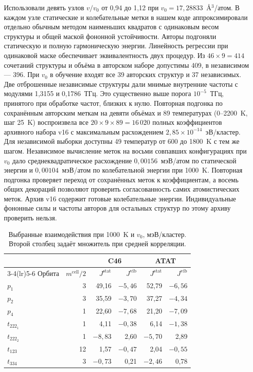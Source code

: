 \documentclass[11pt,a4paper]{article}
\begin{document}
Использовали девять узлов \(v/v_0\) от 0,94 до 1,12 при
\(v_0=17{,}28833\)~\AA\({}^3\)/атом. В каждом узле статические и
колебательные метки в нашем коде аппроксимировали отдельно обычным
методом наименьших квадратов с одинаковым весом структуры и общей
маской фононной устойчивости. Авторы подгоняли статическую и полную
гармоническую энергии. Линейность регрессии при одинаковой маске
обеспечивает эквивалентность двух процедур. Из \(46\times9=414\)
сочетаний структуры и объёма в
авторском наборе допустимы 409, в независимом --- 396. При \(v_0\)
в обучение входят все 39 авторских структур и 37 независимых. Две
отброшенные независимые структуры дали мнимые внутренние частоты с
модулями 1,3155 и 0,1786~ТГц. Это существенно выше порога
\(10^{-5}\)~ТГц, принятого при обработке частот, близких к нулю.
Повторная подгонка по сохранённым авторским меткам на девяти объёмах и
89 температурах (0--2200~K, шаг 25~K) воспроизвела все
\(20\times9\times89=16\,020\) полных коэффициентов архивного набора
v16 с максимальным расхождением \(2{,}85\times10^{-14}\)~эВ/кластер.
Для независимой выборки доступны 49 температур от 600 до 1800~K с тем же
шагом. Независимое вычисление меток на восьми совпавших конфигурациях
при \(v_0\) дало среднеквадратическое расхождение \(0{,}00156\)~мэВ/атом
по статической энергии и \(0{,}00104\)~мэВ/атом по колебательной
энергии при 1000~K. Повторная подгонка проверяет переход от сохранённых
меток к коэффициентам, а восемь общих декораций позволяют проверить
согласованность самих атомистических меток. Архив v16 содержит готовые
колебательные энергии. Индивидуальные фононные силы и частоты авторов
для остальных структур по этому архиву проверить нельзя.

\begin{table}[htbp]
\centering\small
\caption{Выбранные взаимодействия при 1000~K и \(v_0\), мэВ/кластер.
Второй столбец задаёт множитель при средней корреляции.}
\label{tab:ce-model-coeff}
\begin{tabular}{lrrrrr}
\toprule
 & & \multicolumn{2}{c}{C46} & \multicolumn{2}{c}{ATAT}\\
\cmidrule(lr){3-4}\cmidrule(lr){5-6}
Орбита & \(m^{\mathrm{cell}}/2\) &
\(J^{\mathrm{stat}}\) & \(J^{\mathrm{vib}}\) &
\(J^{\mathrm{stat}}\) & \(J^{\mathrm{vib}}\)\\
\midrule
\(p_1\) & 3 & 49,16 & \(-5{,}46\) & 52,79 & \(-6{,}56\)\\
\(p_2\) & 3 & 35,59 & \(-3{,}70\) & 37,27 & \(-4{,}34\)\\
\(p_4\) & 1 & 22,60 & \(-7{,}68\) & 21,20 & \(-7{,}09\)\\
\(t_{222_1}\) & 1 & 4,11 & \(-0{,}38\) & 6,14 & \(-1{,}38\)\\
\(t_{222_2}\) & 1 & \(-8{,}83\) & 2,60 & \(-5{,}70\) & 2,89\\
\(t_{123}\) & 12 & 1,57 & \(-0{,}47\) & 2,04 & \(-0{,}55\)\\
\(t_{334}\) & 3 & \(-0{,}73\) & 0,21 & \(-2{,}46\) & 0,78\\
\bottomrule
\end{tabular}
\end{table}
\end{document}
